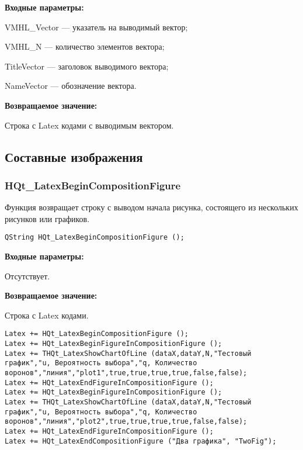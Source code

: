 \documentclass[a4paper,12pt]{article}
\begin{document}
\textbf{Входные параметры:}
 
    VMHL\_Vector --- указатель на выводимый вектор;
 
    VMHL\_N --- количество элементов вектора;
 
    TitleVector --- заголовок выводимого вектора;
 
    NameVector --- обозначение вектора.
	
\textbf{Возвращаемое значение:}

Строка с Latex кодами с выводимым вектором.


\subsection{Составные изображения}

\subsubsection{HQt\_LatexBeginCompositionFigure}\label{HQt_LatexBeginCompositionFigure}

Функция возвращает строку с выводом начала рисунка, состоящего из нескольких рисунков или графиков.


\begin{lstlisting}[label=code_syntax_HQt_LatexBeginCompositionFigure,caption=Синтаксис]
QString HQt_LatexBeginCompositionFigure ();
\end{lstlisting}

\textbf{Входные параметры:}

Отсутствует.

\textbf{Возвращаемое значение:}

Строка с Latex кодами.


\begin{lstlisting}[label=code_use_HQt_LatexBeginCompositionFigure,caption=Пример использования]
Latex += HQt_LatexBeginCompositionFigure ();
Latex += HQt_LatexBeginFigureInCompositionFigure ();
Latex += THQt_LatexShowChartOfLine (dataX,dataY,N,"Тестовый график","u, Вероятность выбора","q, Количество воронов","линия","plot1",true,true,true,true,false,false);
Latex += HQt_LatexEndFigureInCompositionFigure ();
Latex += HQt_LatexBeginFigureInCompositionFigure ();
Latex += THQt_LatexShowChartOfLine (dataX,dataY,N,"Тестовый график","u, Вероятность выбора","q, Количество воронов","линия","plot2",true,true,true,true,false,false);
Latex += HQt_LatexEndFigureInCompositionFigure ();
Latex += HQt_LatexEndCompositionFigure ("Два графика", "TwoFig");
\end{lstlisting}
\end{document}
